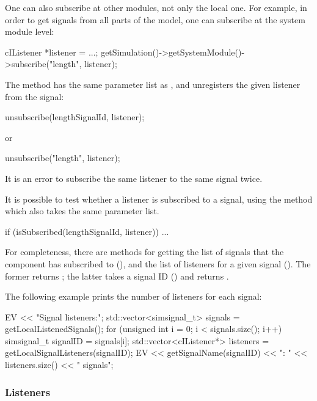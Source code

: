 \begin{ned}
One can also subscribe at other modules, not only the local one.
For example, in order to get signals from all parts of the model,
one can subscribe at the system module level:

\begin{cpp}
cIListener *listener = ...;
getSimulation()->getSystemModule()->subscribe("length", listener);
\end{cpp}

The  method has the same parameter list
as , and unregisters the given listener
from the signal:

\begin{cpp}
unsubscribe(lengthSignalId, listener);
\end{cpp}

or

\begin{cpp}
unsubscribe("length", listener);
\end{cpp}

It is an error to subscribe the same listener to the same
signal twice.

It is possible to test whether a listener is subscribed to a signal,
using the  method which also takes the same
parameter list.

\begin{cpp}
if (isSubscribed(lengthSignalId, listener)) {
    ...
}
\end{cpp}

For completeness, there are methods for getting the list of signals
that the component has subscribed to (),
and the list of listeners for a given signal ().
The former returns ; the latter takes
a signal ID () and returns .

The following example prints the number of listeners for each signal:

\begin{cpp}
EV << "Signal listeners:\n";
std::vector<simsignal_t> signals = getLocalListenedSignals();
for (unsigned int i = 0; i < signals.size(); i++) {
    simsignal_t signalID = signals[i];
    std::vector<cIListener*> listeners = getLocalSignalListeners(signalID);
    EV << getSignalName(signalID) << ": " << listeners.size() << " signals\n";
}
\end{cpp}

\subsubsection{Listeners}
\label{sec:simple-modules:signal-listeners}


\end{ned}
